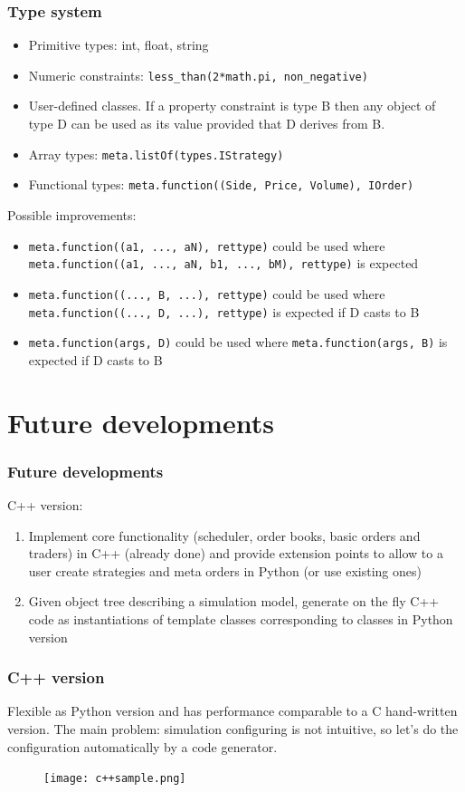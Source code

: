 \documentclass{beamer}
\begin{document}
\begin{frame}
\frametitle{Type system}
\begin{itemize}
  \item Primitive types: int, float, string
  \item Numeric constraints: \texttt{less\_than(2*math.pi, non\_negative)}
  \item User-defined classes. If a property constraint is type B then any object of type D can be used as its value provided that D derives from B.
  \item Array types: \texttt{meta.listOf(types.IStrategy)}
  \item Functional types: \texttt{meta.function((Side, Price, Volume), IOrder)}
\end{itemize}
Possible improvements:
\begin{itemize}
  \item \texttt{meta.function((a1, ..., aN), rettype)} could be used where \texttt{meta.function((a1, ..., aN, b1, ..., bM), rettype)} is expected
  \item \texttt{meta.function((..., B, ...), rettype)} could be used where \texttt{meta.function((..., D, ...), rettype)} is expected if D casts to B
  \item \texttt{meta.function(args, D)} could be used where \texttt{meta.function(args, B)} is expected if D casts to B
\end{itemize}
\end{frame}

\section{Future developments}
\begin{frame}
\frametitle{Future developments}
C++ version:
\begin{enumerate}
  \item Implement core functionality (scheduler, order books, basic orders and traders) in C++ (already done) and provide extension points to allow to a user create strategies and meta orders in Python (or use existing ones)
  \item Given object tree describing a simulation model, generate on the fly C++ code as instantiations of template classes corresponding to classes in Python version
\end{enumerate}
\end{frame}

\begin{frame}
\frametitle{C++ version}
Flexible as Python version and has performance comparable to a C hand-written version. The main problem: simulation configuring is not intuitive, so let's do the configuration automatically by a code generator.
\begin{figure}[htbp]
\centering
\texttt{[image: c++sample.png]}
\end{figure}
\end{frame}
\end{document}
